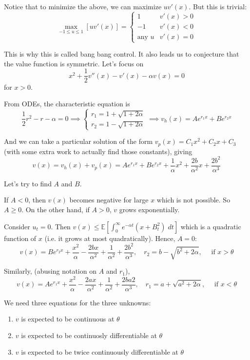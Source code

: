 \documentclass[12pt]{report}
\newcommand{\E}{\mathbb{E}}
\begin{document}
    Notice that to minimize the above, we can maximize $uv'(x)$. But this is trivial:
    \[\max_{-1 \leq u \leq 1} [uv'(x)] = \begin{cases}
        1 & v'(x) > 0\\
        -1 & v'(x) < 0\\
        \text{any } u & v'(x) = 0
    \end{cases}\]

    This is why this is called bang bang control. It also leads us to conjecture that the value function is symmetric. Let's focus on 
    \[x^2 + \frac{1}{2} v''(x) - v'(x) - \alpha v(x) = 0\]
    for $x > 0$. 

    From ODEs, the characteristic equation is 
    \[\frac{1}{2}r^2 - r - \alpha = 0 \implies \begin{cases}
        r_1 = 1 + \sqrt{1 + 2\alpha}\\
        r_2 = 1 - \sqrt{1 + 2\alpha}
    \end{cases}\implies v_h(x) = Ae^{r_1 x} + Be^{r_2x}\]

    And we can take a particular solution of the form $v_p(x) = C_1x^2 + C_2x + C_3$ (with some extra work to actually find those constants), giving 
    \[v(x) = v_h(x) + v_p(x) = Ae^{r_1x} + Be^{r_2x} + \frac{1}{\alpha}x^2 + \frac{2b}{\alpha^2}x + \frac{2b^2}{\alpha^3}\]

    Let's try to find $A$ and $B$. 
    
    If $A < 0$, then $v(x)$ becomes negative for large $x$ which is not possible. So $A \geq 0$. On the other hand, if $A > 0$, $v$ grows exponentially.  

    Consider $u_t = 0$. Then $v(x) \leq \E[\int_0^{\infty} e^{-\alpha t} (x + B_t^2) \; dt]$ which is a quadratic function of $x$ (i.e. it grows at most quadratically). Hence, $A = 0$: 
    \[v(x) = Be^{r_2 x} + \frac{x^2}{\alpha} - \frac{2bx}{\alpha^2} + \frac{1}{\alpha^2} + \frac{2b^2}{\alpha^3}, \quad r_2 = b- \sqrt{b^2 + 2\alpha}, \quad \text{ if } x  >\theta\]

    Similarly, (abusing notation on $A$ and $r_1$),
    \[v(x) = Ae^{r_1 x} + \frac{x^2}{\alpha} - \frac{2ax}{\alpha^2} + \frac{1}{\alpha^2} + \frac{2ba2}{\alpha^3}, \quad r_1 = a + \sqrt{a^2 + 2\alpha}, \quad \text{ if } x  <\theta\]

    We need three equations for the three unknowns:
    \begin{enumerate}
        \item $v$ is expected to be continuous at $\theta$
        \item $v$ is expected to be continuosly differentiable at $\theta$
        \item $v$ is expected to be twice continuously differentiable at $\theta$
    \end{enumerate}
\end{document}
